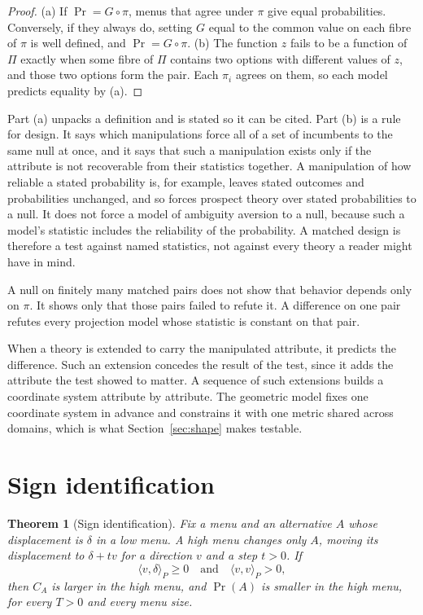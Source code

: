 \documentclass[11pt]{article}
\newtheorem{theorem}{Theorem}
\theoremstyle{definition}
\newcommand{\ip}[2]{\langle #1, #2\rangle_P}
\DeclareMathOperator{\Prob}{Pr}
\begin{document}
\begin{proof}
(a) If $\Prob = G \circ \pi$, menus that agree under $\pi$ give equal probabilities.
Conversely, if they always do, setting $G$ equal to the common value on each fibre of $\pi$ is well defined, and $\Prob = G \circ \pi$.
(b) The function $z$ fails to be a function of $\Pi$ exactly when some fibre of $\Pi$ contains two options with different values of $z$, and those two options form the pair.
Each $\pi_i$ agrees on them, so each model predicts equality by (a).
\end{proof}

Part (a) unpacks a definition and is stated so it can be cited.
Part (b) is a rule for design.
It says which manipulations force all of a set of incumbents to the same null at once, and it says that such a manipulation exists only if the attribute is not recoverable from their statistics together.
A manipulation of how reliable a stated probability is, for example, leaves stated outcomes and probabilities unchanged, and so forces prospect theory over stated probabilities to a null.
It does not force a model of ambiguity aversion \citep{Ellsberg1961} to a null, because such a model's statistic includes the reliability of the probability.
A matched design is therefore a test against named statistics, not against every theory a reader might have in mind.

A null on finitely many matched pairs does not show that behavior depends only on $\pi$.
It shows only that those pairs failed to refute it.
A difference on one pair refutes every projection model whose statistic is constant on that pair.

When a theory is extended to carry the manipulated attribute, it predicts the difference.
Such an extension concedes the result of the test, since it adds the attribute the test showed to matter.
A sequence of such extensions builds a coordinate system attribute by attribute.
The geometric model fixes one coordinate system in advance and constrains it with one metric shared across domains, which is what Section~\ref{sec:shape} makes testable.

\section{Sign identification}\label{sec:sign}

\begin{theorem}[Sign identification]\label{thm:sign}
Fix a menu and an alternative $A$ whose displacement is $\delta$ in a low menu.
A high menu changes only $A$, moving its displacement to $\delta + t v$ for a direction $v$ and a step $t > 0$.
If
\begin{equation}\label{eq:signcond}
\ip{v}{\delta} \ge 0 \quad\text{and}\quad \ip{v}{v} > 0,
\end{equation}
then $C_A$ is larger in the high menu, and $\Prob(A)$ is smaller in the high menu, for every $T > 0$ and every menu size.
\end{theorem}
\end{document}
